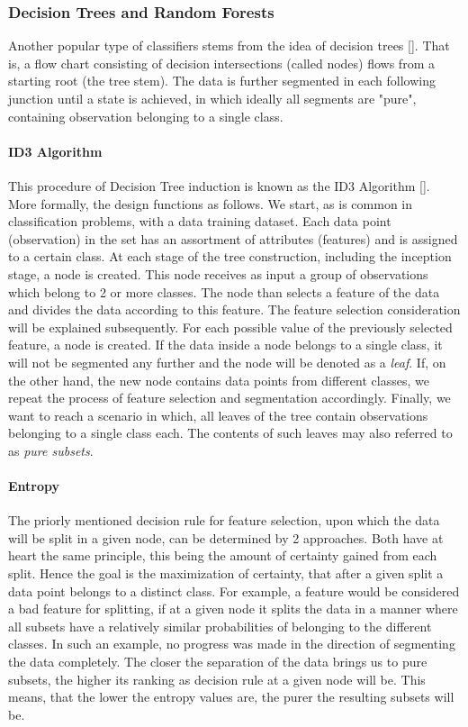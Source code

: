 \subsubsection{Decision Trees and Random Forests}
	Another popular type of classifiers stems from the idea of decision trees [\cite{quinlan2014c4}]. That is, a flow chart consisting of decision intersections (called nodes) flows from a starting root (the tree stem). The data is further segmented in each following junction until a state is achieved, in which ideally all segments are "pure", containing observation belonging to a single class. 
		
	\paragraph{ID3 Algorithm} 
		This procedure of Decision Tree induction is known as the ID3 Algorithm [\cite{quinlan1986induction}]. More formally, the design functions as follows. We start, as is common in classification problems, with a data training dataset. Each data point (observation) in the set has an assortment of attributes (features) and is assigned to a certain class. At each stage of the tree construction, including the inception stage, a node is created. This node receives as input a group of observations which belong to 2 or more classes. The node than selects a feature of the data and divides the data according to this feature. The feature selection consideration will be explained subsequently. For each possible value of the previously selected feature, a node is created. If the data inside a node belongs to a single class, it will not be segmented any further and the node will be denoted as a \textit{leaf}. If, on the other hand, the new node contains data points from different classes, we repeat the process of feature selection and segmentation accordingly. Finally, we want to reach a scenario in which, all leaves of the tree contain observations belonging to a single class each. The contents of such leaves may also referred to as \textit{pure subsets}.
		
		\paragraph{Entropy}
		The priorly mentioned decision rule for feature selection, upon which the data will be split in a given node, can be determined by 2 approaches. Both have at heart the same principle, this being the amount of certainty gained from each split. Hence the goal is the maximization of certainty, that after a given split a data point belongs to a distinct class. For example, a feature would be considered a bad feature for splitting, if at a given node it splits the data in a manner where all subsets have a relatively similar probabilities of belonging to the different classes. In such an example, no progress was made in the direction of segmenting the data completely. The closer the separation of the data brings us to pure subsets, the higher its ranking as decision rule at a given node will be. This means, that the lower the entropy values are, the purer the resulting subsets will be.
		
